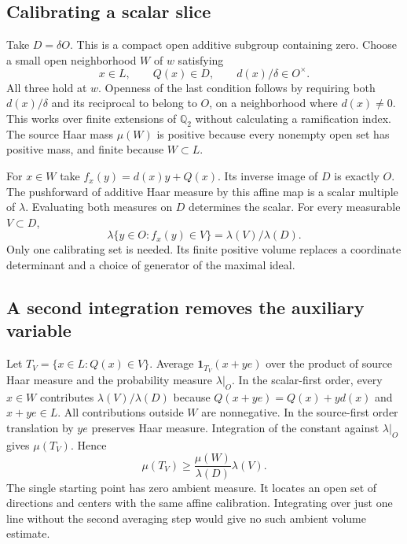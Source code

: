 \documentclass[12pt,letterpaper]{article}
\begin{document}
\subsection{Calibrating a scalar slice}
Take $D=\delta O$. This is a compact open additive subgroup containing zero. Choose a small open neighborhood $W$ of $w$ satisfying
\[
 x\in L,\qquad Q(x)\in D,\qquad d(x)/\delta\in O^\times.
\]
All three hold at $w$. Openness of the last condition follows by requiring both $d(x)/\delta$ and its reciprocal to belong to $O$, on a neighborhood where $d(x)\ne0$. This works over finite extensions of $\mathbb Q_2$ without calculating a ramification index. The source Haar mass $\mu(W)$ is positive because every nonempty open set has positive mass, and finite because $W\subset L$.
\par
For $x\in W$ take $f_x(y)=d(x)y+Q(x)$. Its inverse image of $D$ is exactly $O$. The pushforward of additive Haar measure by this affine map is a scalar multiple of $\lambda$. Evaluating both measures on $D$ determines the scalar. For every measurable $V\subset D$,
\[
 \lambda\{y\in O:f_x(y)\in V\}=\lambda(V)/\lambda(D).
\]
Only one calibrating set is needed. Its finite positive volume replaces a coordinate determinant and a choice of generator of the maximal ideal.
\subsection{A second integration removes the auxiliary variable}
Let $T_V=\{x\in L:Q(x)\in V\}$. Average $\mathbf1_{T_V}(x+ye)$ over the product of source Haar measure and the probability measure $\lambda|_O$. In the scalar-first order, every $x\in W$ contributes $\lambda(V)/\lambda(D)$ because $Q(x+ye)=Q(x)+y d(x)$ and $x+ye\in L$. All contributions outside $W$ are nonnegative. In the source-first order translation by $ye$ preserves Haar measure. Integration of the constant against $\lambda|_O$ gives $\mu(T_V)$. Hence
\[
 \mu(T_V)\ge \frac{\mu(W)}{\lambda(D)}\lambda(V).
\]
The single starting point has zero ambient measure. It locates an open set of directions and centers with the same affine calibration. Integrating over just one line without the second averaging step would give no such ambient volume estimate.
\end{document}

